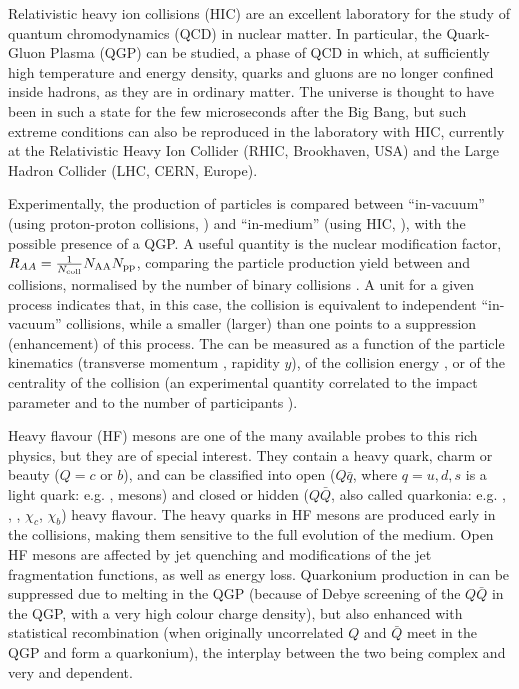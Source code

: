 \documentclass[a4paper,11pt]{article}
\begin{document}
Relativistic heavy ion collisions (HIC) are an excellent laboratory for the study of quantum chromodynamics (QCD) in nuclear matter. In particular, the Quark-Gluon Plasma (QGP) can be studied, a phase of QCD in which, at sufficiently high temperature and energy density, quarks and gluons are no longer confined inside hadrons, as they are in ordinary matter. The universe is thought to have been in such a state for the few microseconds after the Big Bang, but such extreme conditions can also be reproduced in the laboratory with HIC, currently at the Relativistic Heavy Ion Collider (RHIC, Brookhaven, USA)
and the Large Hadron Collider (LHC, CERN, Europe).

Experimentally, the production of particles is compared between ``in-vacuum'' (using proton-proton collisions, \pp) and ``in-medium'' (using HIC, \AAA), with the possible presence of a QGP. A useful quantity is the nuclear modification factor, $R_{AA} = \frac{1}{N_{\text{coll}}}{N_{\text{AA}}}{N_{{\text{pp}}}}$, comparing the particle production yield between \pp and \AAA collisions, normalised by the number of binary collisions \ncoll. A unit \raa for a given process indicates that, in this case, the \AAA collision is equivalent to independent ``in-vacuum'' \pp collisions, while a \raa smaller (larger) than one points to a suppression (enhancement) of this process. The \raa can be measured as a function of the particle kinematics (transverse momentum \pt, rapidity $y$), of the collision energy \sqrtsnn, or of the centrality of the collision (an experimental quantity correlated to the impact parameter and to the number of participants \npart).

Heavy flavour (HF) mesons are one of the many available probes to this rich physics, but they are of special interest. They contain a heavy quark, charm or beauty ($Q = c$ or $b$), and can be classified into open ($Q\bar{q}$, where $q = u, d, s$ is a light quark: e.g. \D, \B mesons) and closed or hidden ($Q\bar{Q}$, also called quarkonia: e.g. \Jpsi, \psiP,  \PgUabc, $\chi_c$, $\chi_b$) heavy flavour.
The heavy quarks in HF mesons are produced early in the collisions, making them sensitive to the full evolution of the medium. Open HF mesons are affected by jet quenching and modifications of the jet fragmentation functions, as well as energy loss. Quarkonium production in \AAA can be suppressed due to melting in the QGP (because of Debye screening of the $Q\bar{Q}$ in the QGP, with a very high colour charge density), but also enhanced with statistical recombination (when originally uncorrelated $Q$ and $\bar{Q}$ meet in the QGP and form a quarkonium), the interplay between the two being complex and very \pt and \sqrtsnn dependent.
\end{document}
